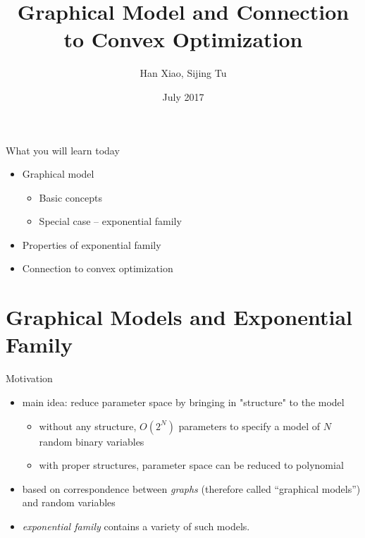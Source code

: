 \documentclass[t]{beamer}
\date[July 2017] {July 2017}
\title{Graphical Model and Connection to Convex Optimization}
\author{Han Xiao, Sijing Tu}
\institute[] %
{
  Department of Computer Science\\
  Aalto University
}
\newcommand{\vparam}{\ensuremath{\theta}}
\begin{document}
\maketitle

\begin{frame}{What you will learn today}
   \begin{itemize}
   \setlength\itemsep{0.5em}
   \item {Graphical model
   \begin{itemize}
     \item Basic concepts 
     \item Special case -- exponential family
     \end{itemize}
   }
   \item Properties of exponential family 
   \item Connection to convex optimization
   \end{itemize}
\end{frame}

\section{Graphical Models and Exponential Family}
\begin{frame}{Motivation}
   \begin{itemize}
	\item {main idea: reduce parameter space by bringing in "structure" to the model
    	\begin{itemize}
	    \item without any structure, $O(2^N)$ parameters to specify a model of $N$ random binary variables
    	\item with proper structures, parameter space can be reduced to polynomial
    	\end{itemize}}
    \item based on correspondence between \textit{graphs} (therefore called ``graphical models'') and random variables
    \item \textit{exponential family} contains a variety of such models.
   \end{itemize}
\end{frame}

\newcommand{\suffset}{\ensuremath{\mathcal{I}}}
\newcommand{\real}{\ensuremath{\mathcal{R}}}
\newcommand{\measure}{\ensuremath{\mathit{v}}}
\newcommand{\innerprod}[1]{\ensuremath{\langle #1 \rangle}}
\newcommand{\pp}{\ensuremath{p_{\vparam}}}
\end{document}
